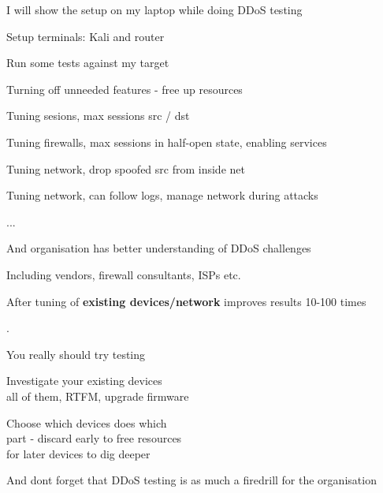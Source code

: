 \documentclass[Screen16to9,17pt]{foils}
\begin{document}
\begin{list1}
\item I will show the setup on my laptop while doing DDoS testing
\item Setup terminals: Kali and router
\item Run some tests against my target
\end{list1}


\begin{list1}
\item Turning off unneeded features - free up resources
\item Tuning sesions, max sessions src / dst
\item Tuning firewalls, max sessions in half-open state, enabling services
\item Tuning network, drop spoofed src from inside net \smiley
\item Tuning network, can follow logs, manage network during attacks
\item ...
\item And organisation has better understanding of DDoS challenges
\item Including vendors, firewall consultants, ISPs etc.
\end{list1}

\vskip 1cm
\centerline{After tuning of {\bf existing devices/network} improves results 10-100 times}


.
\begin{list1}
\item You really should try testing
\item Investigate your existing devices\\
all of them, RTFM, upgrade firmware
\item Choose which devices does which\\
part - discard early to free resources\\
for later devices to dig deeper
\end{list1}

\vskip 4cm
\centerline{And dont forget that DDoS testing is as much a firedrill for the organisation}
\end{document}
